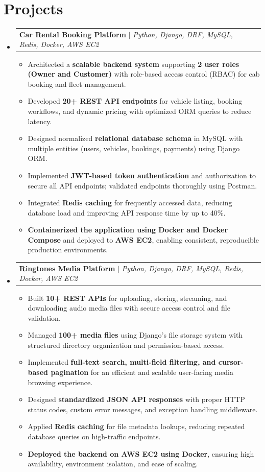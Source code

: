 \documentclass[letterpaper,11pt]{article}
\makeatletter
\newcommand{\resumeItem}[1]{\item\small{{#1 \vspace{-2pt}}}}
\newcommand{\resumeProjectHeading}[2]{
    \item
    \begin{tabular*}{1.001\textwidth}{l@{\extracolsep{\fill}}r}
      \small#1 & \textbf{\small #2}\\
    \end{tabular*}\vspace{-6pt}
}
\newcommand{\resumeItemListStart}{\begin{itemize}}
\newcommand{\resumeItemListEnd}{\end{itemize}\vspace{-5pt}}
\newcommand{\resumeSubHeadingListStart}{\begin{itemize}[leftmargin=0.0in, label={}]}
\newcommand{\resumeSubHeadingListEnd}{\end{itemize}}
\makeatother
\begin{document}
\section{Projects}
\resumeSubHeadingListStart

\resumeProjectHeading
{\textbf{Car Rental Booking Platform} $|$ \emph{Python, Django, DRF, MySQL, Redis, Docker, AWS EC2}}{}
\resumeItemListStart
\resumeItem{Architected a \textbf{scalable backend system} supporting \textbf{2 user roles (Owner and Customer)} with role-based access control (RBAC) for cab booking and fleet management.}
\resumeItem{Developed \textbf{20+ REST API endpoints} for vehicle listing, booking workflows, and dynamic pricing with optimized ORM queries to reduce latency.}
\resumeItem{Designed normalized \textbf{relational database schema} in MySQL with multiple entities (users, vehicles, bookings, payments) using Django ORM.}
\resumeItem{Implemented \textbf{JWT-based token authentication} and authorization to secure all API endpoints; validated endpoints thoroughly using Postman.}
\resumeItem{Integrated \textbf{Redis caching} for frequently accessed data, reducing database load and improving API response time by up to 40\%.}
\resumeItem{\textbf{Containerized the application using Docker and Docker Compose} and deployed to \textbf{AWS EC2}, enabling consistent, reproducible production environments.}
\resumeItemListEnd

\resumeProjectHeading
{\textbf{Ringtones Media Platform} $|$ \emph{Python, Django, DRF, MySQL, Redis, Docker, AWS EC2}}{}
\resumeItemListStart
\resumeItem{Built \textbf{10+ REST APIs} for uploading, storing, streaming, and downloading audio media files with secure access control and file validation.}
\resumeItem{Managed \textbf{100+ media files} using Django's file storage system with structured directory organization and permission-based access.}
\resumeItem{Implemented \textbf{full-text search, multi-field filtering, and cursor-based pagination} for an efficient and scalable user-facing media browsing experience.}
\resumeItem{Designed \textbf{standardized JSON API responses} with proper HTTP status codes, custom error messages, and exception handling middleware.}
\resumeItem{Applied \textbf{Redis caching} for file metadata lookups, reducing repeated database queries on high-traffic endpoints.}
\resumeItem{\textbf{Deployed the backend on AWS EC2 using Docker}, ensuring high availability, environment isolation, and ease of scaling.}
\resumeItemListEnd

\resumeSubHeadingListEnd
\end{document}
